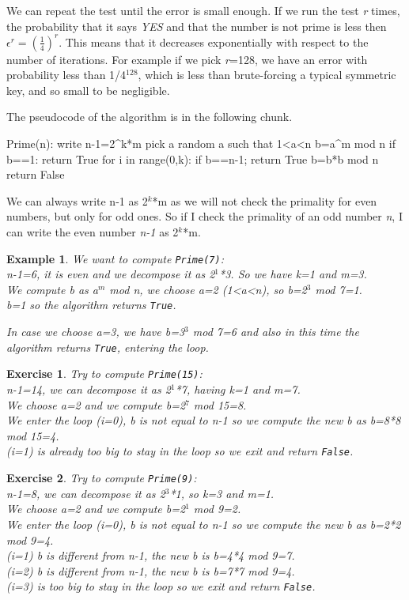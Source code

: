 \documentclass[a4paper, 12pt]{report}
\newtheorem{example}{\textbf{Example}}
\newtheorem{exercise}{\textbf{Exercise}}
\begin{document}
We can repeat the test until the error is small enough. If we run the test \textit{r} times, the probability that it says \textit{YES} and that the number is not prime is less then $\epsilon^r=(\frac{1}{4})^r$. This means that it decreases exponentially with respect to the number of iterations. For example if we pick \textit{r}=128, we have an error with probability less than 1/4$^{128}$, which is less than brute-forcing a typical symmetric key, and so small to be negligible.

The pseudocode of the algorithm is in the following chunk.
\begin{python}
Prime(n):
	write n-1=2^k*m
	pick a random a such that 1<a<n
	b=a^m mod n
	if b==1:
		return True
	for i in range(0,k):
		if b==n-1;
			return True
		b=b*b mod n
	return False
\end{python}

We can always write n-1 as 2$^k$*m as we will not check the primality for even numbers, but only for odd ones. So if I check the primality of an odd number \textit{n}, I can write the even number \textit{n-1} as 2$^k$*m.

\begin{example}
	We want to compute \texttt{Prime(7)}:\\
	n-1=6, it is even and we decompose it as 2$^1$*3. So we have k=1 and m=3.\\
	We compute b as a$^m$ mod n, we choose a=2 (1<a<n), so b=2$^3$ mod 7=1.\\
	b=1 so the algorithm returns \texttt{True}.
	
	In case we choose a=3, we have b=3$^3$ mod 7=6 and also in this time the algorithm returns \texttt{True}, entering the loop.
\end{example}

\begin{exercise}
	Try to compute \texttt{Prime(15)}:\\
	n-1=14, we can decompose it as 2$^1$*7, having k=1 and m=7.\\
	We choose a=2 and we compute b=2$^7$ mod 15=8.\\
	We enter the loop (i=0), b is not equal to n-1 so we compute the new b as b=8*8 mod 15=4.\\
	(i=1) is already too big to stay in the loop so we exit and return \texttt{False}.
\end{exercise}

\begin{exercise}
	Try to compute \texttt{Prime(9)}:\\
	n-1=8, we can decompose it as 2$^3$*1, so k=3 and m=1.\\
	We choose a=2 and we compute b=2$^1$ mod 9=2.\\
	We enter the loop (i=0), b is not equal to n-1 so we compute the new b as b=2*2 mod 9=4.\\
	(i=1) b is different from n-1, the new b is b=4*4 mod 9=7.\\
	(i=2) b is different from n-1, the new b is b=7*7 mod 9=4.\\
	(i=3) is too big to stay in the loop so we exit and return \texttt{False}.
\end{exercise}
\end{document}
